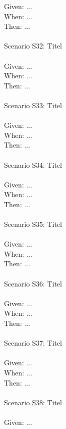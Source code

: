 \begin{tabbing}
    Given:  \> \> \> ...\\
    When:   \> \> \> ...\\
    Then:   \> \> \> ...\\
    \\
    Scenario S32: \> \> \> Titel \\ \\
    Given:  \> \> \> ...\\
    When:   \> \> \> ...\\
    Then:   \> \> \> ...\\
    \\
    Scenario S33: \> \> \> Titel \\ \\
    Given:  \> \> \> ...\\
    When:   \> \> \> ...\\
    Then:   \> \> \> ...\\
    \\
    Scenario S34: \> \> \> Titel \\ \\
    Given:  \> \> \> ...\\
    When:   \> \> \> ...\\
    Then:   \> \> \> ...\\
    \\
    Scenario S35: \> \> \> Titel \\ \\
    Given:  \> \> \> ...\\
    When:   \> \> \> ...\\
    Then:   \> \> \> ...\\
    \\
    Scenario S36: \> \> \> Titel \\ \\
    Given:  \> \> \> ...\\
    When:   \> \> \> ...\\
    Then:   \> \> \> ...\\
    \\
    Scenario S37: \> \> \> Titel \\ \\
    Given:  \> \> \> ...\\
    When:   \> \> \> ...\\
    Then:   \> \> \> ...\\
    \\
    Scenario S38: \> \> \> Titel \\ \\
    Given:  \> \> \> ...\\

\end{tabbing}

